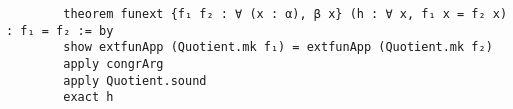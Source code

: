 \documentclass{article}
\begin{document}
	\begin{lstlisting}
		theorem funext {f₁ f₂ : ∀ (x : α), β x} (h : ∀ x, f₁ x = f₂ x) : f₁ = f₂ := by
		show extfunApp (Quotient.mk f₁) = extfunApp (Quotient.mk f₂)
		apply congrArg
		apply Quotient.sound
		exact h
	\end{lstlisting}
\end{document}
